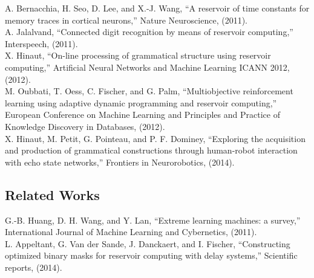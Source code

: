 \documentclass[
10pt, %
a4paper, %
oneside, %
headinclude,footinclude, %
BCOR5mm, %
]{scrartcl}
\begin{document}
\noindent
A. Bernacchia, H. Seo, D. Lee, and X.-J. Wang, “A reservoir of time constants for memory traces in cortical neurons,” Nature Neuroscience, (2011).\\

\noindent
A. Jalalvand, “Connected digit recognition by means of reservoir computing,” Interspeech, (2011).\\

\noindent
X. Hinaut, “On-line processing of grammatical structure using reservoir computing,” Artificial Neural Networks and Machine Learning ICANN 2012, (2012).\\

\noindent
M. Oubbati, T. Oess, C. Fischer, and G. Palm, “Multiobjective reinforcement learning using adaptive dynamic programming and reservoir computing,” European Conference on Machine Learning and Principles and Practice of Knowledge Discovery in Databases, (2012).\\

\noindent
X. Hinaut, M. Petit, G. Pointeau, and P. F. Dominey, “Exploring the acquisition and production of grammatical constructions through human-robot interaction with echo state networks,” Frontiers in Neurorobotics, (2014).

\subsection{Related Works}
G.-B. Huang, D. H. Wang, and Y. Lan, “Extreme learning machines: a survey,” International Journal of Machine Learning and Cybernetics, (2011).\\

\vspace{-1mm}
\noindent
L. Appeltant, G. Van der Sande, J. Danckaert, and I. Fischer, “Constructing optimized binary masks for reservoir computing with delay systems,” Scientific reports, (2014).
\end{document}
